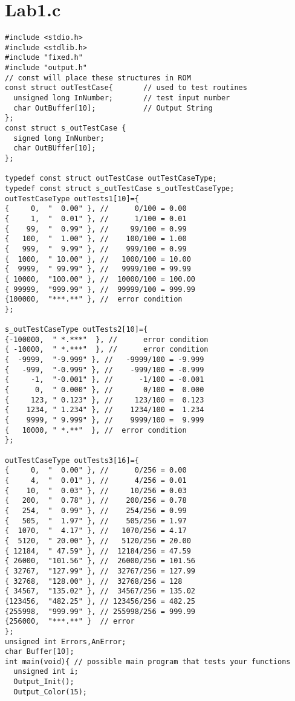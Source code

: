 \documentclass[11pt]{article}
\begin{document}
\section*{Lab1.c}
\begin{verbatim}
#include <stdio.h>
#include <stdlib.h>
#include "fixed.h"
#include "output.h"
// const will place these structures in ROM
const struct outTestCase{       // used to test routines
  unsigned long InNumber;       // test input number
  char OutBuffer[10];           // Output String  
};
const struct s_outTestCase {
  signed long InNumber;
  char OutBUffer[10];
};

typedef const struct outTestCase outTestCaseType;
typedef const struct s_outTestCase s_outTestCaseType;
outTestCaseType outTests1[10]={ 
{     0,  "  0.00" }, //      0/100 = 0.00  
{     1,  "  0.01" }, //      1/100 = 0.01  
{    99,  "  0.99" }, //     99/100 = 0.99
{   100,  "  1.00" }, //    100/100 = 1.00
{   999,  "  9.99" }, //    999/100 = 0.99
{  1000,  " 10.00" }, //   1000/100 = 10.00
{  9999,  " 99.99" }, //   9999/100 = 99.99
{ 10000,  "100.00" }, //  10000/100 = 100.00
{ 99999,  "999.99" }, //  99999/100 = 999.99
{100000,  "***.**" }, //  error condition
};

s_outTestCaseType outTests2[10]={ 
{-100000,  " *.***"  }, //      error condition   
{ -10000,  " *.***"  }, //      error condition 
{  -9999,  "-9.999" }, //   -9999/100 = -9.999
{   -999,  "-0.999" }, //    -999/100 = -0.999
{     -1,  "-0.001" }, //      -1/100 = -0.001
{      0,  " 0.000" }, //       0/100 =  0.000
{     123, " 0.123" }, //     123/100 =  0.123
{    1234, " 1.234" }, //    1234/100 =  1.234
{    9999, " 9.999" }, //    9999/100 =  9.999
{   10000, " *.**"  }, //  error condition
};

outTestCaseType outTests3[16]={ 
{     0,  "  0.00" }, //      0/256 = 0.00  
{     4,  "  0.01" }, //      4/256 = 0.01  
{    10,  "  0.03" }, //     10/256 = 0.03
{   200,  "  0.78" }, //    200/256 = 0.78
{   254,  "  0.99" }, //    254/256 = 0.99
{   505,  "  1.97" }, //    505/256 = 1.97
{  1070,  "  4.17" }, //   1070/256 = 4.17
{  5120,  " 20.00" }, //   5120/256 = 20.00
{ 12184,  " 47.59" }, //  12184/256 = 47.59
{ 26000,  "101.56" }, //  26000/256 = 101.56
{ 32767,  "127.99" }, //  32767/256 = 127.99
{ 32768,  "128.00" }, //  32768/256 = 128
{ 34567,  "135.02" }, //  34567/256 = 135.02
{123456,  "482.25" }, // 123456/256 = 482.25
{255998,  "999.99" }, // 255998/256 = 999.99
{256000,  "***.**" }  // error
};
unsigned int Errors,AnError;
char Buffer[10];
int main(void){ // possible main program that tests your functions
  unsigned int i;
  Output_Init();
  Output_Color(15);


\end{verbatim}
\end{document}
